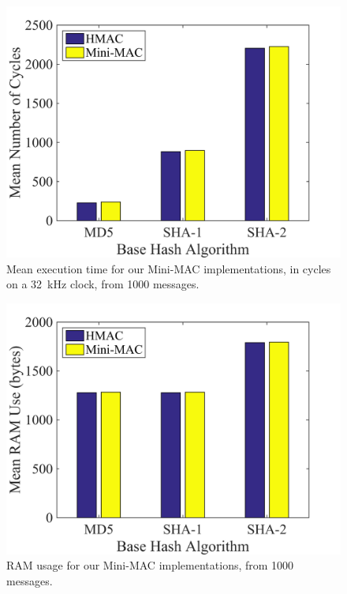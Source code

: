 	\begin{figure}
		\centering
		\includegraphics[width=\columnwidth]{figures/exec_cycles.png}
		\caption{Mean execution time for our Mini-MAC implementations, in cycles on a 32~kHz clock,
		from 1000 messages.}
		\label{fig-execution}
	\end{figure}
	
	\begin{figure}
		\centering
		\includegraphics[width=\columnwidth]{figures/ram_usage.png}
		\caption{RAM usage for our Mini-MAC implementations, from 1000 messages.}
		\label{fig-ram}
	\end{figure}
	
